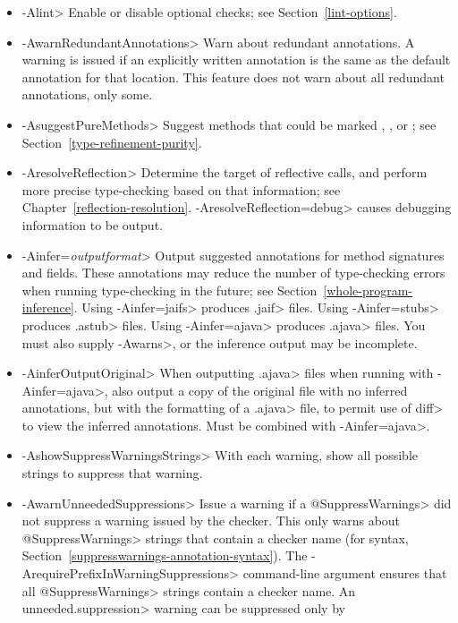 \begin{itemize}
\item \<-Alint>
  Enable or disable optional checks; see Section~\ref{lint-options}.
\item \<-AwarnRedundantAnnotations>
  Warn about redundant annotations.
  A warning is issued if an explicitly written annotation
  is the same as the default annotation for that location.
  This feature does not warn about all redundant annotations, only some.
\item \<-AsuggestPureMethods>
  Suggest methods that could be marked
  ,
  ,
  or ; see
  Section~\ref{type-refinement-purity}.
\item \<-AresolveReflection>
  Determine the target of reflective calls, and perform more precise
  type-checking based on that information; see
  Chapter~\ref{reflection-resolution}.  \<-AresolveReflection=debug> causes
  debugging information to be output.
\item \<-Ainfer=\emph{outputformat}>
  Output suggested annotations for method signatures and fields.
  These annotations may reduce the number of type-checking
  errors when running type-checking in the future; see
  Section~\ref{whole-program-inference}.
  Using \<-Ainfer=jaifs> produces \<.jaif> files.
  Using \<-Ainfer=stubs> produces \<.astub> files.
  Using \<-Ainfer=ajava> produces \<.ajava> files.
  You must also supply \<-Awarns>, or the inference output may be incomplete.
\item \<-AinferOutputOriginal>
  When outputting \<.ajava> files when running with \<-Ainfer=ajava>,
  also output a copy of the original file with no inferred annotations,
  but with the formatting of a \<.ajava> file, to permit use of \<diff>
  to view the inferred annotations. Must be combined with \<-Ainfer=ajava>.
\item \<-AshowSuppressWarningsStrings>
  With each warning, show all possible strings to suppress that warning.
\item \<-AwarnUnneededSuppressions>
  Issue a warning if a \<@SuppressWarnings> did not suppress a warning
  issued by the checker.  This only warns about
  \<@SuppressWarnings> strings that contain a checker name
  (for syntax, Section~\ref{suppresswarnings-annotation-syntax}).  The
  \<-ArequirePrefixInWarningSuppressions> command-line argument ensures
  that all \<@SuppressWarnings> strings contain a checker name.
  An \<unneeded.suppression> warning can be suppressed only by

\end{itemize}
